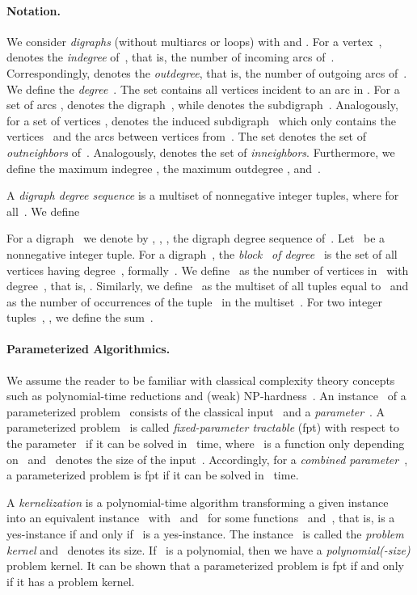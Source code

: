 \documentclass[a4paper,11pt]{article}
\theoremstyle{remark}
\theoremstyle{plain}
\theoremstyle{definition}
\begin{document}
\paragraph{Notation.}
We consider \emph{digraphs} (without multiarcs or loops)  with  and .
For a vertex~,  denotes the \emph{indegree} of~, that is, the number of incoming arcs of~. Correspondingly,  denotes the \emph{outdegree}, that is, the number of outgoing arcs of~.
We define the \emph{degree}~.
The set  contains all vertices incident to an arc in .
For a set of arcs ,  denotes the digraph~, while  denotes the  subdigraph~.
Analogously, for a set of vertices ,  denotes the induced subdigraph~ which only contains the vertices~ and the arcs between vertices from~.
The set  denotes the set of \emph{outneighbors} of~. Analogously,  denotes the set of \emph{inneighbors}.
Furthermore, we define the maximum indegree , the maximum outdegree , and~.

A \emph{digraph degree sequence}  is a multiset of nonnegative integer tuples, where  for all~. We define

For a digraph~ we denote by , , , the digraph degree sequence of~.
Let~ be a nonnegative integer tuple.
For a digraph~, the \emph{block}~ \emph{of degree~} is the set of all vertices having degree~, formally~.
We define~ as the number of vertices in~ with degree~, that is, .
Similarly, we define~ as the multiset of all tuples equal to~
and  as the number of occurrences of the tuple~ in the multiset~.
For two integer tuples~, , we define the sum~.

\paragraph{Parameterized Algorithmics. \cite{Cyg15,DF13,FG06,Nie06}} We assume the reader to be familiar with classical complexity theory concepts such as polynomial-time reductions and (weak) NP-hardness~\cite{GJ79, AB09}.
An instance~ of a parameterized problem~ consists
of the classical input~ and a \emph{parameter}~. A parameterized problem~ is called \emph{fixed-parameter tractable} (fpt) with respect to the parameter~ if it can be solved in~ time, where~ is a function only depending on~ and~ denotes the size of the input~.
Accordingly, for a \emph{combined parameter}~, a parameterized problem is fpt if it can be solved in~ time.

A \emph{kernelization} is a polynomial-time algorithm transforming a given instance~ into an equivalent instance~ with~ and~ for some functions~ and~, that is,  is a yes-instance if and only if~ is a yes-instance.
The instance~ is called the \emph{problem kernel} and~ denotes its size.
If~ is a polynomial, then we have a \emph{polynomial(-size)} problem kernel.
It can be shown that a parameterized problem is fpt if and only if it has a problem kernel.
\end{document}
